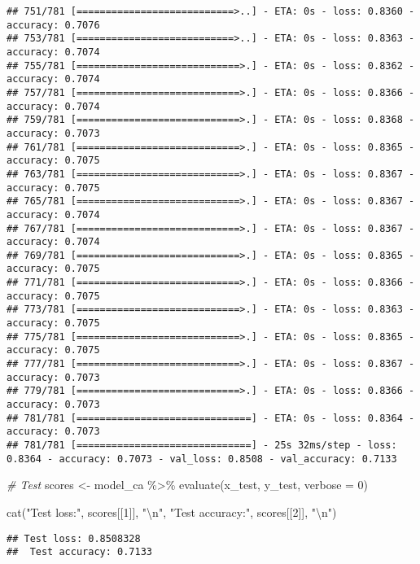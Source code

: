\documentclass[
]{article}
\newenvironment{Shaded}{\begin{snugshade}}{\end{snugshade}}
\newcommand{\AttributeTok}[1]{\textcolor[rgb]{0.77,0.63,0.00}{#1}}
\newcommand{\CommentTok}[1]{\textcolor[rgb]{0.56,0.35,0.01}{\textit{#1}}}
\newcommand{\DecValTok}[1]{\textcolor[rgb]{0.00,0.00,0.81}{#1}}
\newcommand{\FunctionTok}[1]{\textcolor[rgb]{0.00,0.00,0.00}{#1}}
\newcommand{\NormalTok}[1]{#1}
\newcommand{\OtherTok}[1]{\textcolor[rgb]{0.56,0.35,0.01}{#1}}
\newcommand{\SpecialCharTok}[1]{\textcolor[rgb]{0.00,0.00,0.00}{#1}}
\newcommand{\StringTok}[1]{\textcolor[rgb]{0.31,0.60,0.02}{#1}}
\begin{document}
\begin{verbatim}
## 751/781 [===========================>..] - ETA: 0s - loss: 0.8360 - accuracy: 0.7076
## 753/781 [===========================>..] - ETA: 0s - loss: 0.8363 - accuracy: 0.7074
## 755/781 [============================>.] - ETA: 0s - loss: 0.8362 - accuracy: 0.7074
## 757/781 [============================>.] - ETA: 0s - loss: 0.8366 - accuracy: 0.7074
## 759/781 [============================>.] - ETA: 0s - loss: 0.8368 - accuracy: 0.7073
## 761/781 [============================>.] - ETA: 0s - loss: 0.8365 - accuracy: 0.7075
## 763/781 [============================>.] - ETA: 0s - loss: 0.8367 - accuracy: 0.7075
## 765/781 [============================>.] - ETA: 0s - loss: 0.8367 - accuracy: 0.7074
## 767/781 [============================>.] - ETA: 0s - loss: 0.8367 - accuracy: 0.7074
## 769/781 [============================>.] - ETA: 0s - loss: 0.8365 - accuracy: 0.7075
## 771/781 [============================>.] - ETA: 0s - loss: 0.8366 - accuracy: 0.7075
## 773/781 [============================>.] - ETA: 0s - loss: 0.8363 - accuracy: 0.7075
## 775/781 [============================>.] - ETA: 0s - loss: 0.8365 - accuracy: 0.7075
## 777/781 [============================>.] - ETA: 0s - loss: 0.8367 - accuracy: 0.7073
## 779/781 [============================>.] - ETA: 0s - loss: 0.8366 - accuracy: 0.7073
## 781/781 [==============================] - ETA: 0s - loss: 0.8364 - accuracy: 0.7073
## 781/781 [==============================] - 25s 32ms/step - loss: 0.8364 - accuracy: 0.7073 - val_loss: 0.8508 - val_accuracy: 0.7133
\end{verbatim}

\begin{Shaded}
\begin{Highlighting}[]
\CommentTok{\# Test}
\NormalTok{scores }\OtherTok{\textless{}{-}}\NormalTok{ model\_ca }\SpecialCharTok{\%\textgreater{}\%} \FunctionTok{evaluate}\NormalTok{(x\_test, y\_test, }\AttributeTok{verbose =} \DecValTok{0}\NormalTok{)}

\FunctionTok{cat}\NormalTok{(}\StringTok{"Test loss:"}\NormalTok{, scores[[}\DecValTok{1}\NormalTok{]], }\StringTok{"}\SpecialCharTok{\textbackslash{}n}\StringTok{"}\NormalTok{,}
    \StringTok{"Test accuracy:"}\NormalTok{, scores[[}\DecValTok{2}\NormalTok{]], }\StringTok{"}\SpecialCharTok{\textbackslash{}n}\StringTok{"}\NormalTok{)}
\end{Highlighting}
\end{Shaded}

\begin{verbatim}
## Test loss: 0.8508328 
##  Test accuracy: 0.7133
\end{verbatim}
\end{document}
